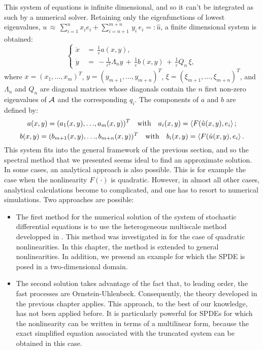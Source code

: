 This system of equations is infinite dimensional, and so it can't be integrated as such by a numerical solver.
Retaining only the eigenfunctions of lowest eigenvalues, $u\,\approx\, \sum^{n}_{i=1}x_i e_i + \sum_{i=n+1}^{m+n} \,y_{i}\,e_{i} =: \hat u$, a finite dimensional system is obtained:
\begin{equation}
    \left\{\begin{aligned} 
            \dot x\,&=\,\frac 1 {\varepsilon}a(x, y) ,\\ \dot
            y\,&=\,-\frac 1 {\varepsilon^{2}} \Lambda_{n}  y\,+\,\frac 1 {\varepsilon}
            b(x,y)\,+\,\frac 1 \varepsilon Q_n\,{\xi}, 
        \end{aligned} \right.  
    \label{eq: finite dimensional system of equations}
\end{equation} 
where $x = (x_1, \dots, x_m)^{T}$, $y = (y_{m+1}, \dots, y_{m + n})^{T}$, $\xi= (\xi_{m+1}, \dots, \xi_{m+n})^{T}$, and $\Lambda_{n}$ and $Q_{n}$ are diagonal matrices whose diagonals contain the $n$ first non-zero eigenvalues of $\mathcal A$ and the corresponding $q_{i}$.
The components of $a$ and $b$ are defined by: 
\begin{equation*} 
    a(x, y) = (a_{1}(x,y), {\dots},a_{m}(x,y))^{T} \quad \text{with} \quad a_{i}(x,y) = \left \langle F(\hat u(x,y),e_i \right\rangle;
    \label{eq: coefficient a in the slow process}
\end{equation*} 
\begin{equation} 
    b(x, y) = (b_{m+1}(x,y), {\dots},b_{m+n}(x,y))^{T} \quad \text{with} \quad b_{i}(x,y) = \left \langle F(\hat u(x,y),e_i \right\rangle.
    \label{eq: coefficient b in the fast process}
\end{equation} 
This system fits into the general framework of the previous section, and so the spectral method that we presented seems ideal to find an approximate solution.
In some cases, an analytical approach is also possible.
This is for example the case when the nonlinearity $F({\cdot})$ is quadratic.
However, in almost all other cases, analytical calculations become to complicated, and one has to resort to numerical simulations.
Two approaches are possible:
\begin{itemize} 
    \item The first method for the numerical solution of the system of stochastic differential equations is to use the heterogeneous multiscale method developped in \cite{weinan2005analysis}.
        This method was investigated in \cite{abdulle2012numerical} for the case of quadratic nonlinearities.
        In this chapter, the method is extended to general nonlinearities. In addition, we presend an example for which the SPDE is posed in a two-dimensional domain.
    \item The second solution takes advantage of the fact that, to leading order, the fast processes are Ornstein-Uhlenbeck.
        Consequently, the theory developed in the previous chapter applies.
        This approach, to the best of our knowledge, has not been applied before.
        It is particularly powerful for SPDEs for which the nonlinearity can be written in terms of a multilinear form, because the exact simplified equation associated with the truncated system can be obtained in this case. 
\end{itemize} 

